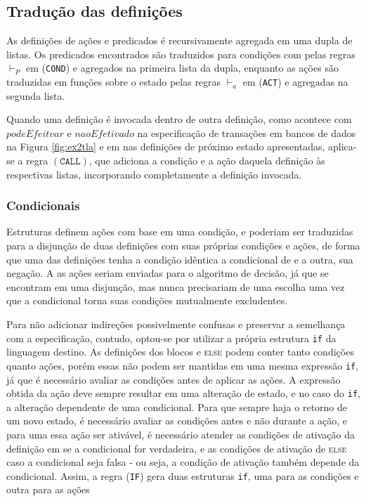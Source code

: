 \subsection{Tradução das definições}

As definições de ações e predicados é recursivamente agregada em uma dupla de
listas. Os predicados encontrados são traduzidos para condições com pelas regras
$\vdash_P$ em (\texttt{COND}) e agregados na primeira lista da dupla, enquanto as ações são
traduzidas em funções sobre o estado pelas regras $\vdash_a$ em (\texttt{ACT}) e agregadas na
segunda lista.

Quando uma definição é invocada dentro de outra definição, como acontece com
$podeEfeitvar$ e $naoEfetivado$ na especificação de transações em bancos de
dados na Figura \ref{fig:ex2tla} e em nas definições de próximo estado apresentadas, aplica-se a regra
$(\texttt{CALL})$, que adiciona a condição e a ação daquela definição às
respectivas listas, incorporando completamente a definição invocada.



\subsubsection{Condicionais}

Estruturas \IF definem ações com base em uma condição, e poderiam ser traduzidas
para a disjunção de duas definições com suas próprias condições e ações, de forma que uma das
definições tenha a condição idêntica a condicional de \IF e a outra, sua
negação. A as ações seriam enviadas para o algoritmo de decisão, já que se
encontram em uma disjunção, mas nunca precisariam de uma escolha uma vez que a
condicional torna suas condições mutualmente excludentes.

Para não adicionar
indireções possivelmente confusas e preservar a semelhança com a especificação, contudo, optou-se por utilizar
a própria estrutura \texttt{if} da linguagem destino. As definições dos blocos
\IF e \textsc{else} podem conter tanto condições quanto ações, porém essas não
podem ser mantidas em uma mesma expressão \texttt{if}, já que é necessário
avaliar as condições antes de aplicar as ações. A expressão obtida da ação deve
sempre resultar em uma alteração de estado, e no caso do \texttt{if}, a alteração
dependente de uma condicional. Para que sempre haja o retorno de um novo estado, é necessário avaliar as
condições antes e não durante a ação, e para uma essa ação \IF ser ativável, é necessário
atender as condições de ativação da definição em
\THEN se a condicional for verdadeira, e as condições de ativação de \textsc{else} caso
a condicional seja falsa - ou seja, a condição de ativação também depende da
condicional. Assim, a regra (\texttt{IF}) gera duas estruturas \texttt{if}, uma
para as condições e outra para as ações

